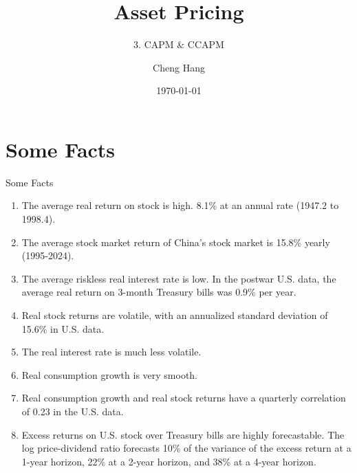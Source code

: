 \documentclass{beamer}
\title[Asset Pricing]{\textbf{Asset Pricing}} %
\subtitle{3. CAPM \& CCAPM}
\author[Cheng Hang]{Cheng Hang} %
\institute[DUFE] %
{School of Fintech \\
	Dongbei University of Finance \& Economics \\ %
	\medskip
	\textbf{chenghangch@qq.com}%
}
\date{\today} %
\begin{document}
\begin{frame}
	\titlepage %
\end{frame}




\section{Some Facts}

\begin{frame}{Some Facts}
	\begin{enumerate}
		\item The average real return on stock is high. 8.1\% at an annual rate (1947.2 to 1998.4).
            \item The average stock market return of China's stock market is 15.8\% yearly (1995-2024).
		\item The average riskless real interest rate is low. In the postwar U.S. data, the average real return on 3-month Treasury bills was 0.9\% per year.
		\item Real stock returns are volatile, with an annualized standard deviation of 15.6\% in U.S. data.
		\item The real interest rate is much less volatile.
		\item Real consumption growth is very smooth.
		\item Real consumption growth and real stock returns have a quarterly correlation of 0.23 in the U.S. data.
		\item Excess returns on U.S. stock over Treasury bills are highly forecastable. The log price-dividend ratio forecasts 10\% of the variance of the excess return at a 1-year horizon, 22\% at a 2-year horizon, and 38\% at a 4-year horizon.
	\end{enumerate}
\end{frame}
\end{document}
